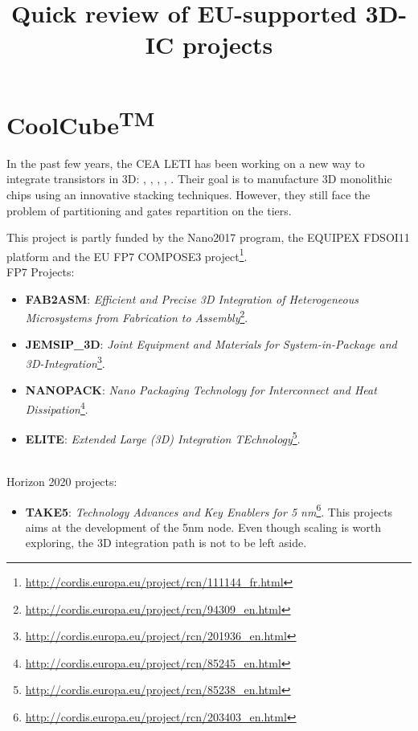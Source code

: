 \documentclass[11pt,a4paper]{extarticle}
\title{Quick review of EU-supported 3D-IC projects}
\theoremstyle{customdef}
\begin{document}
\maketitle

\section*{CoolCube\textsuperscript{TM}}
In the past few years, the CEA LETI has been working on a new way to integrate transistors in 3D: \cite{Clermidy2015}, \cite{Michailos2016}, \cite{Brunet2016}, \cite{Vinet2016}, \cite{Batude2015}.
Their goal is to manufacture 3D monolithic chips using an innovative stacking techniques.
However, they still face the problem of partitioning and gates repartition on the tiers.

This project is partly funded by the Nano2017 program, the EQUIPEX FDSOI11 platform and the EU FP7 COMPOSE3 project\footnote{\url{http://cordis.europa.eu/project/rcn/111144_fr.html}}.\\

FP7 Projects:
\begin{itemize}
	\item \textbf{FAB2ASM}: \textit{Efficient and Precise 3D Integration of Heterogeneous Microsystems from Fabrication to Assembly}\footnote{\url{http://cordis.europa.eu/project/rcn/94309_en.html}}.
	\item \textbf{JEMSIP\_3D}: \textit{Joint Equipment and Materials for System-in-Package and 3D-Integration}\footnote{\url{http://cordis.europa.eu/project/rcn/201936_en.html}}.
	\item \textbf{NANOPACK}: \textit{Nano Packaging Technology for Interconnect and Heat Dissipation}\footnote{\url{http://cordis.europa.eu/project/rcn/85245_en.html}}.
	\item \textbf{ELITE}: \textit{Extended Large (3D) Integration TEchnology}\footnote{\url{http://cordis.europa.eu/project/rcn/85238_en.html}}.
\end{itemize}
~\\

Horizon 2020 projects:
\begin{itemize}
	\item \textbf{TAKE5}: \textit{Technology Advances and Key Enablers for 5 nm}\footnote{\url{http://cordis.europa.eu/project/rcn/203403_en.html}}. This projects aims at the development of the 5nm node. Even though scaling is worth exploring, the 3D integration path is not to be left aside.
\end{itemize}
\newpage

% 

\end{document}
